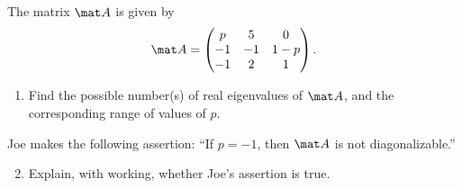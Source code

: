 \begin{problem}
    The matrix $\mat A$ is given by \[\mat A = \begin{pmatrix}p & 5 & 0 \\ -1 & - 1 & 1 - p \\ -1 & 2 & 1\end{pmatrix}.\]

    \begin{enumerate}
        \item Find the possible number(s) of real eigenvalues of $\mat A$, and the corresponding range of values of $p$.
    \end{enumerate}

    Joe makes the following assertion: ``If $p = -1$, then $\mat A$ is not diagonalizable.''

    \begin{enumerate}
        \setcounter{enumi}{1}
        \item Explain, with working, whether Joe's assertion is true.
    \end{enumerate}
\end{problem}
